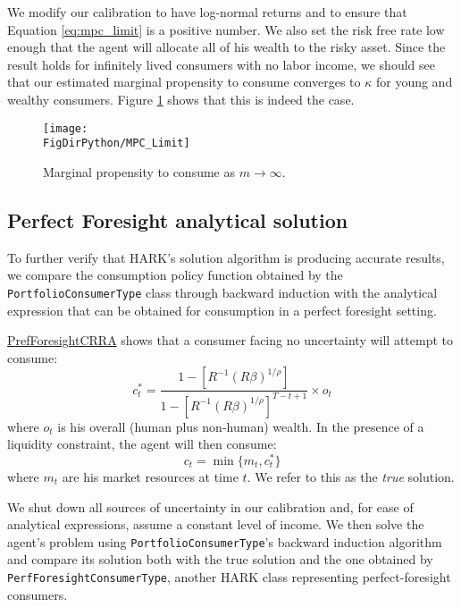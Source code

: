 \documentclass[../CGMPort.tex]{subfiles}
\begin{document}
We modify our calibration to have log-normal returns and to ensure that 
Equation \ref{eq:mpc_limit} is a positive number. We also set the risk free
rate low enough that the agent will allocate all of his wealth to the risky
asset. Since the result holds for infinitely lived consumers with no labor 
income, we should see that our estimated marginal propensity to consume 
converges to $\kappa$ for young and wealthy consumers. Figure \ref{fig:mpc_lim} 
shows that this is indeed the case.

\begin{figure}[h]
	\texttt{[image: \\FigDirPython/MPC\_Limit]}
	\caption{Marginal propensity to consume as $m \rightarrow \infty$.}
	\label{fig:mpc_lim}
\end{figure}

\subsection{Perfect Foresight analytical solution}

To further verify that HARK's solution algorithm is producing accurate results,
we compare the consumption policy function obtained by the
\texttt{PortfolioConsumerType} class through backward induction with the
analytical expression that can be obtained for consumption in a perfect
foresight setting.

\href{http://www.econ2.jhu.edu/people/ccarroll/public/LectureNotes/Consumption/PerfForesightCRRA/}{PrefForesightCRRA}
shows that a consumer facing no uncertainty will attempt to consume:
\begin{equation}
	c^*_t = \frac{1 - \left[ R^{-1} \left( R \beta \right)^{1/\rho}\right]}{1 - 
	\left[ R^{-1} \left( R \beta \right)^{1/\rho}\right]^{T-t+1}}\times o_t
\end{equation}
where $o_t$ is his overall (human plus non-human) wealth. In the presence of a liquidity constraint, the agent will then consume:
\begin{equation}
	c_t = \min \{ m_t , c^*_t\}
\end{equation}
where $m_t$ are his market resources at time $t$. We refer to this as the 
\emph{true} solution.

We shut down all sources of uncertainty in our calibration and, for ease of
analytical expressions, assume a constant level of income. We then solve the
agent's problem using \texttt{PortfolioConsumerType}'s backward induction
algorithm and compare its solution both with the true solution and the one
obtained by \texttt{PerfForesightConsumerType}, another HARK class representing perfect-foresight consumers.
\end{document}
